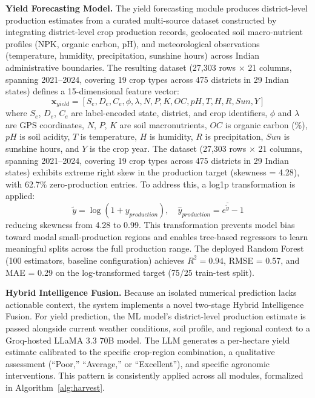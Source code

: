 \documentclass[conference]{IEEEtran}
\begin{document}
\textbf{Yield Forecasting Model.} The yield forecasting module produces district-level production estimates from a curated multi-source dataset constructed by integrating district-level crop production records, geolocated soil macro-nutrient profiles (NPK, organic carbon, pH), and meteorological observations (temperature, humidity, precipitation, sunshine hours) across Indian administrative boundaries. The resulting dataset (27,303 rows $\times$ 21 columns, spanning 2021--2024, covering 19 crop types across 475 districts in 29 Indian states) defines a 15-dimensional feature vector:
\begin{equation}
\mathbf{x}_{yield} = [S_e, D_e, C_e, \phi, \lambda, N, P, K, OC, pH, T, H, R, Sun, Y]
\label{eq:yield_features}
\end{equation}
where $S_e$, $D_e$, $C_e$ are label-encoded state, district, and crop identifiers, $\phi$ and $\lambda$ are GPS coordinates, $N$, $P$, $K$ are soil macronutrients, $OC$ is organic carbon (\%), $pH$ is soil acidity, $T$ is temperature, $H$ is humidity, $R$ is precipitation, $Sun$ is sunshine hours, and $Y$ is the crop year. The dataset (27,303 rows $\times$ 21 columns, spanning 2021--2024, covering 19 crop types across 475 districts in 29 Indian states) exhibits extreme right skew in the production target (skewness = 4.28), with 62.7\% zero-production entries. To address this, a log1p transformation is applied:
\begin{equation}
\tilde{y} = \log(1 + y_{production}), \quad \hat{y}_{production} = e^{\hat{\tilde{y}}} - 1
\label{eq:log1p}
\end{equation}
reducing skewness from 4.28 to 0.99. This transformation prevents model bias toward modal small-production regions and enables tree-based regressors to learn meaningful splits across the full production range. The deployed Random Forest (100 estimators, baseline configuration) achieves $R^2 = 0.94$, RMSE = 0.57, and MAE = 0.29 on the log-transformed target (75/25 train-test split).

\textbf{Hybrid Intelligence Fusion.} Because an isolated numerical prediction lacks actionable context, the system implements a novel two-stage Hybrid Intelligence Fusion. For yield prediction, the ML model's district-level production estimate is passed alongside current weather conditions, soil profile, and regional context to a Groq-hosted LLaMA 3.3 70B model. The LLM generates a per-hectare yield estimate calibrated to the specific crop-region combination, a qualitative assessment (``Poor,'' ``Average,'' or ``Excellent''), and specific agronomic interventions. This pattern is consistently applied across all modules, formalized in Algorithm~\ref{alg:harvest}.
\end{document}
